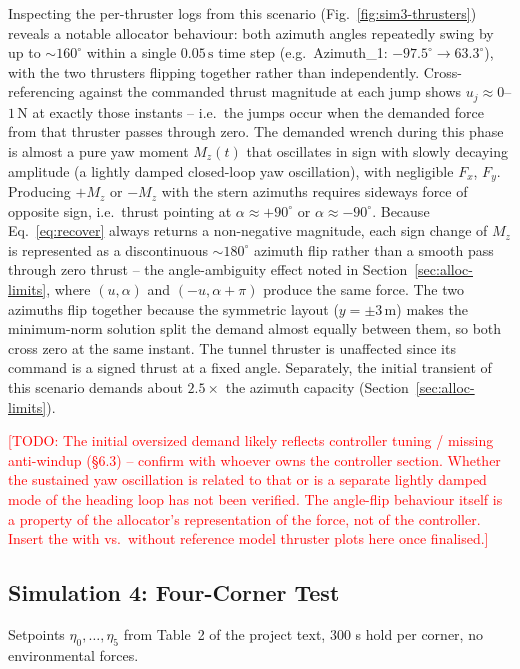 \documentclass[10pt,conference]{IEEEtran}
\newcommand{\todo}[1]{\textcolor{red}{[TODO: #1]}}
\begin{document}
Inspecting the per-thruster logs from this scenario (Fig.~\ref{fig:sim3-thrusters}) reveals a notable
allocator behaviour: both azimuth angles repeatedly swing by up to
$\sim\!160^\circ$ within a single $0.05\,\mathrm{s}$ time step (e.g.\
Azimuth\_1: $-97.5^\circ\!\to\!63.3^\circ$), with the two thrusters
flipping together rather than independently. Cross-referencing against
the commanded thrust magnitude at each jump shows $u_j\approx0$–$1\,
\mathrm{N}$ at exactly those instants -- i.e.\ the jumps occur when
the demanded force from that thruster passes through zero. The
demanded wrench during this phase is almost a pure yaw moment
$M_z(t)$ that oscillates in sign with slowly decaying amplitude (a
lightly damped closed-loop yaw oscillation), with negligible $F_x$,
$F_y$. Producing $+M_z$ or $-M_z$ with the stern azimuths requires
sideways force of opposite sign, i.e.\ thrust pointing at
$\alpha\approx+90^\circ$ or $\alpha\approx-90^\circ$. Because
Eq.~\eqref{eq:recover} always returns a non-negative magnitude, each
sign change of $M_z$ is represented as a discontinuous $\sim\!180^\circ$
azimuth flip rather than a smooth pass through zero thrust -- the
angle-ambiguity effect noted in Section~\ref{sec:alloc-limits}, where
$(u,\alpha)$ and $(-u,\alpha+\pi)$ produce the same force. The two
azimuths flip together because the symmetric layout
($y=\pm3\,\mathrm{m}$) makes the minimum-norm solution split the
demand almost equally between them, so both cross zero at the same
instant. The tunnel thruster is unaffected since its command is a
signed thrust at a fixed angle. Separately, the initial transient of
this scenario demands about $2.5\times$ the azimuth capacity
(Section~\ref{sec:alloc-limits}).

\todo{The initial oversized demand likely reflects controller tuning /
missing anti-windup (\S6.3) -- confirm with whoever owns the
controller section. Whether the sustained yaw oscillation is related
to that or is a separate lightly damped mode of the heading loop has
not been verified. The angle-flip behaviour itself is a property of
the allocator's representation of the force, not of the controller.
Insert the with vs.\ without reference model thruster plots here once
finalised.}

\subsection{Simulation 4: Four-Corner Test}
Setpoints $\eta_0,\ldots,\eta_5$ from Table~2 of the project text,
300 s hold per corner, no environmental forces.
\end{document}
